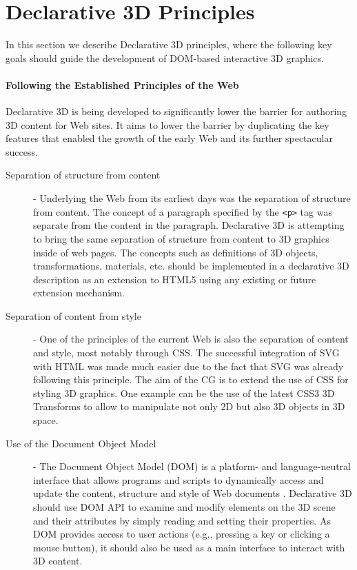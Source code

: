 \documentclass[review]{acmsiggraph}
\begin{document}
\section{Declarative 3D Principles}
\label{sec:Principles}

In this section we describe Declarative 3D principles, where the following key goals should guide the development of DOM-based interactive 3D graphics.

\paragraph{Following the Established Principles of the Web}
Declarative 3D is being developed to significantly lower the barrier for authoring 3D content for Web sites. It aims to lower the barrier by duplicating the key features that enabled the growth of the early Web and its further spectacular success.

\begin{description}
  \item [Separation of structure from content] - Underlying the Web from its earliest days was the separation of structure from content. The concept of a paragraph specified by the \verb|<p>| tag was separate from the content in the paragraph. Declarative 3D is attempting to bring the same separation of structure from content to 3D graphics inside of web pages. The concepts such as definitions of 3D objects, transformations, materials, etc. should be implemented in a declarative 3D description as an extension to HTML5 using any existing or future extension mechanism.
  \item [Separation of content from style] - One of the principles of the current Web is also the separation of content and style, most notably through CSS. The successful integration of SVG with HTML was made much easier due to the fact that SVG was already following this principle.
      The aim of the CG is to extend the use of CSS for styling 3D graphics. One example can be the use of the latest CSS3 3D Transforms to allow to manipulate not only 2D but also 3D objects in 3D space.
  \item [Use of the Document Object Model] - The Document Object Model (DOM) is a platform- and language-neutral interface that allows programs and scripts to dynamically access and update the content, structure and style of Web documents \cite{W3C-DOM}. Declarative 3D should use DOM API to examine and modify elements on the 3D scene and their attributes by simply reading and setting their properties.
      As DOM provides access to user actions (e.g., pressing a key or clicking a mouse button), it should also be used as a main interface to interact with 3D content.
\end{description}
\end{document}
